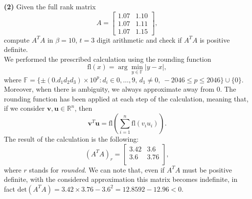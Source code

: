 \documentclass[a4paper,11pt]{article}
\newcommand{\R}{\mathbb{R}}
\begin{document}
\noindent \textbf{(2)} Given the full rank matrix
\begin{equation}\label{key}
	A = \begin{bmatrix}
		1.07 & 1.10  \\
		1.07 & 1.11  \\
		1.07 & 1.15 
	\end{bmatrix},
\end{equation}
compute $A^T A$ in $\beta = 10$, $t=3$ digit arithmetic and check if $A^T A$ is positive definite.\\
We performed the prescribed calculation using the rounding function
\begin{equation}\label{eq:fl(x)}
	\text{fl}(x) = \arg \min_{y\in \mathbb{F}} |y-x|,
\end{equation}
where $\mathbb{F} = \{\pm(0.d_1d_2d_3)\times 10^p : d_i \in {0,\dots,9},\, d_{1}\neq 0, \ -2046\le p \le 2046\} \cup \{0\}$. Moreover, when there is ambiguity, we always approximate away from $0$. The rounding function has been applied at each step of the calculation, meaning that, if we consider $\textbf{v}, \textbf{u} \in \R^n$, then
\begin{equation}\label{key}
	\textbf{v}^T \textbf{u} = \text{fl} \left( \sum_{i=1}^{n}\text{fl} (v_i u_i)\right) .
\end{equation}
The result of the calculation is the following:
\begin{equation}\label{key}
	(A^T A)_{r} =  \begin{bmatrix}
		3.42 & 3.6  \\
		3.6 & 3.76  \\
	\end{bmatrix},
\end{equation}
where $r$ stands for \textit{rounded}. We can note that, even if $A^{T}A$ must be positive definite, with the considered approximation this matrix becomes indefinite, in fact $\text{det}(A^T A) = 3.42 \times 3.76 - 3.6^2 = 12.8592 -  12.96 < 0$.\\
\end{document}
